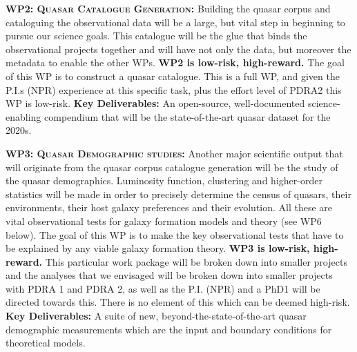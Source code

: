 \documentclass[oneside, a4paper, onecolumn, 11pt]{article}
\begin{document}
\smallskip
\smallskip
\noindent
\textbf{\textsc{WP2: Quasar Catalogue Generation:}} 
Building the quasar corpus and cataloguing the observational data will
be a large, but vital step in beginning to pursue our science
goals. This catalogue will be the glue that binds the observational
projects together and will have not only the data, but moreover the
metadata to enable the other WPs.
{\bf WP2 is low-risk, high-reward.}
The goal of this WP is to construct a quasar catalogue.
This is a full WP, and given the P.I.s (NPR) experience at this
specific task, plus the effort level of PDRA2 this WP is low-risk. 
{\bf Key Deliverables:} An open-source, well-documented science-enabling compendium that
will be the state-of-the-art quasar dataset for the 2020s. 


\smallskip
\smallskip
\noindent
\textbf{\textsc{WP3: Quasar Demographic studies:}} 
Another major scientific output that will originate from the quasar
corpus catalogue generation will be the study of the quasar
demographics. 
Luminosity function, clustering and higher-order
statistics will be made in order to precisely determine the census of
quasars, their environments, their host galaxy preferences and their
evolution. All these are vital observational tests for galaxy
formation models and theory (see WP6 below).
The goal of this WP is to make the key observational tests that have
to be explained by any viable galaxy formation theory.  
{\bf WP3 is low-risk, high-reward.}
This particular work package will be broken down into smaller projects
and the analyses that we envisaged will be broken down into smaller
projects with PDRA 1 and PDRA 2, as
well as the P.I. (NPR) and a PhD1 will be directed
towards this. There is no element of this which can be deemed
high-risk.
{\bf Key Deliverables:} A suite of new, beyond-the-state-of-the-art 
quasar demographic measurements which are the input 
and boundary conditions for theoretical models. 
\end{document}
